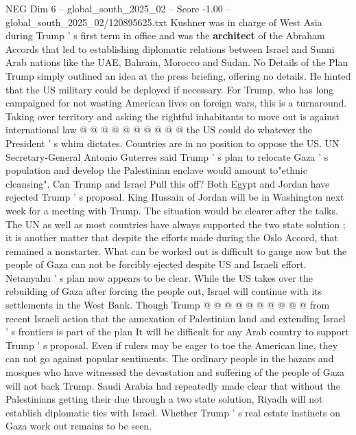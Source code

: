 \begin{textsample}{NEG Dim 6 – global\_south\_2025\_02 – Score -1.00 – global\_south\_2025\_02/120895625.txt}
Kushner was in charge of West Asia during Trump ' s first term in office and was the \textbf{architect} of the Abraham Accords that led to establishing diplomatic relations between Israel and Sunni Arab nations like the UAE, Bahrain, Morocco and Sudan.
No Details of the Plan Trump simply outlined an idea at the press briefing, offering no details.
He hinted that the US military could be deployed if necessary.
For Trump, who has long campaigned for not wasting American lives on foreign wars, this is a turnaround.
Taking over territory and asking the rightful inhabitants to move out is against international law @ @ @ @ @ @ @ @ @ @ the US could do whatever the President ' s whim dictates.
Countries are in no position to oppose the US.
UN Secretary-General Antonio Guterres said Trump ' s plan to relocate Gaza ' s population and develop the Palestinian enclave would amount to"ethnic cleansing".
Can Trump and Israel Pull this off?
Both Egypt and Jordan have rejected Trump ' s proposal.
King Hussain of Jordan will be in Washington next week for a meeting with Trump.
The situation would be clearer after the talks.
The UN as well as most countries have always supported the two state solution ; it is another matter that despite the efforts made during the Oslo Accord, that remained a nonstarter.
What can be worked out is difficult to gauge now but the people of Gaza can not be forcibly ejected despite US and Israeli effort.
Netanyahu ' s plan now appears to be clear.
While the US takes over the rebuilding of Gaza after forcing the people out, Israel will continue with its settlements in the West Bank.
Though Trump @ @ @ @ @ @ @ @ @ @ from recent Israeli action that the annexation of Palestinian land and extending Israel ' s frontiers is part of the plan It will be difficult for any Arab country to support Trump ' s proposal.
Even if rulers may be eager to toe the American line, they can not go against popular sentiments.
The ordinary people in the bazars and mosques who have witnessed the devastation and suffering of the people of Gaza will not back Trump.
Saudi Arabia had repeatedly made clear that without the Palestinians getting their due through a two state solution, Riyadh will not establish diplomatic ties with Israel.
Whether Trump ' s real estate instincts on Gaza work out remains to be seen.

\end{textsample}
